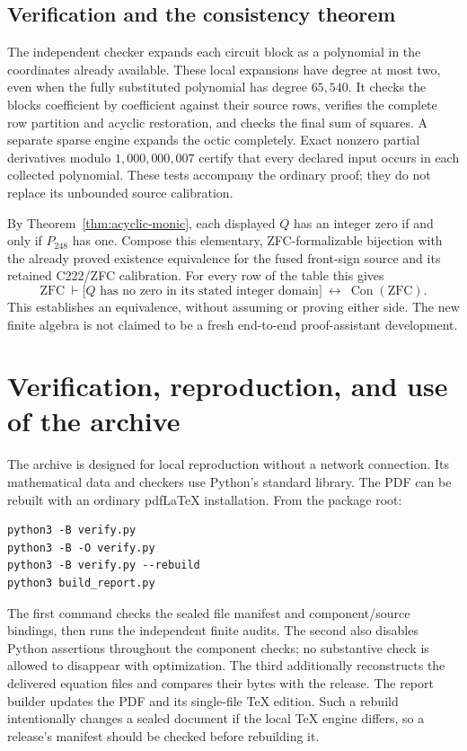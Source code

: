\documentclass[11pt,letterpaper]{article}
\theoremstyle{definition}
\theoremstyle{remark}
\begin{document}
\subsection{Verification and the consistency theorem}

The independent checker expands each circuit block as a polynomial in
the coordinates already available.  These local expansions have
degree at most two, even when the fully substituted polynomial has degree
$65{,}540$.  It checks the blocks coefficient by coefficient against their
source rows, verifies the complete row partition and acyclic restoration,
and checks the final sum of squares.  A separate sparse engine expands
the octic completely.  Exact nonzero partial derivatives modulo
$1{,}000{,}000{,}007$ certify that every declared input occurs
in each collected polynomial.  These tests accompany the ordinary proof;
they do not replace its unbounded source calibration.

By Theorem~\ref{thm:acyclic-monic}, each displayed $Q$ has an integer zero
if and only if $P_{248}$ has one.  Compose this elementary, ZFC-formalizable
bijection with the already proved existence equivalence for the fused
front-sign source and its retained C222/ZFC calibration.  For every row
of the table this gives
\[
 \mathrm{ZFC}\ \vdash
 \bigl[\text{$Q$ has no zero in its stated integer domain}\bigr]
 \ \longleftrightarrow\ \operatorname{Con}(\mathrm{ZFC}).
\]
This establishes an equivalence, without assuming or proving either
side.  The new finite algebra is not claimed to be a fresh end-to-end
proof-assistant development.


\section{Verification, reproduction, and use of the archive}
\label{sec:verification}

The archive is designed for local reproduction without a network connection.
Its mathematical data and checkers use Python's standard library.  The PDF
can be rebuilt with an ordinary pdfLaTeX installation.  From the package root:
\begin{verbatim}
python3 -B verify.py
python3 -B -O verify.py
python3 -B verify.py --rebuild
python3 build_report.py
\end{verbatim}
The first command checks the sealed file manifest and component/source
bindings, then runs the independent finite audits.  The second also disables
Python assertions throughout the component checks; no substantive check is
allowed to disappear with optimization.  The third additionally reconstructs
the delivered equation files and compares their bytes with the release.
The report builder updates the PDF and its single-file TeX edition.  Such a
rebuild intentionally changes a sealed document if the local TeX engine
differs, so a release's manifest should be checked before rebuilding it.
\end{document}
